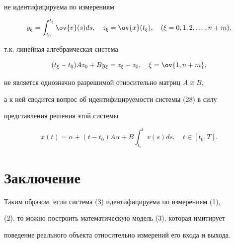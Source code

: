 не идентифицируема по измерениям


$$


y_{\xi}=\int_{t_0}^{t_{\xi}}\ov{v}(s)ds,\quad


z_{\xi}=\ov{x}(t_{\xi}),\quad (\xi= 0,1, 2, \dotsc, n+m),


$$


т.к. линейная алгебраическая система


$$


(t_{\xi}-t_0)Az_0+B y_{\xi} = z_{\xi} - z_0,\quad \xi = \ov{1,n+m},


$$


не является однозначно разрешимой относительно матриц $A$ и $B,$


а к ней сводится вопрос об идентифицируемости системы (28) в силу 


представления решения этой системы


$$


x(t) = \alpha + (t-t_0) A\alpha + B\int_{t_0}^{t} v(s)ds,\quad


t\in[t_0,T].


$$





\section*{Заключение}





Таким образом, если система (3) идентифицируема по измерениям (1),


(2), то можно построить математическую модель (3), которая имитирует


поведение реального объекта относительно измерений его входа и выхода.








